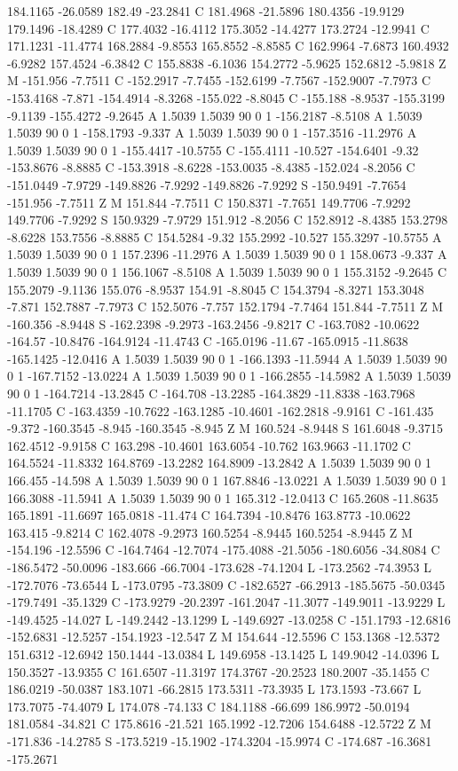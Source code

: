 {{{184.1165 -26.0589 182.49 -23.2841 C 181.4968 -21.5896 180.4356 -19.9129 179.1496 -18.4289 C 177.4032 -16.4112 175.3052 -14.4277 173.2724 -12.9941 C 171.1231 -11.4774 168.2884 -9.8553 165.8552 -8.8585 C 162.9964 -7.6873 160.4932 -6.9282 157.4524 -6.3842 C 155.8838 -6.1036 154.2772 -5.9625 152.6812 -5.9818 Z M -151.956 -7.7511 C -152.2917 -7.7455 -152.6199 -7.7567 -152.9007 -7.7973 C -153.4168 -7.871 -154.4914 -8.3268 -155.022 -8.8045 C -155.188 -8.9537 -155.3199 -9.1139 -155.4272 -9.2645 A 1.5039 1.5039 90 0 1 -156.2187 -8.5108 A 1.5039 1.5039 90 0 1 -158.1793 -9.337 A 1.5039 1.5039 90 0 1 -157.3516 -11.2976 A 1.5039 1.5039 90 0 1 -155.4417 -10.5755 C -155.4111 -10.527 -154.6401 -9.32 -153.8676 -8.8885 C -153.3918 -8.6228 -153.0035 -8.4385 -152.024 -8.2056 C -151.0449 -7.9729 -149.8826 -7.9292 -149.8826 -7.9292 S -150.9491 -7.7654 -151.956 -7.7511 Z M 151.844 -7.7511 C 150.8371 -7.7651 149.7706 -7.9292 149.7706 -7.9292 S 150.9329 -7.9729 151.912 -8.2056 C 152.8912 -8.4385 153.2798 -8.6228 153.7556 -8.8885 C 154.5284 -9.32 155.2992 -10.527 155.3297 -10.5755 A 1.5039 1.5039 90 0 1 157.2396 -11.2976 A 1.5039 1.5039 90 0 1 158.0673 -9.337 A 1.5039 1.5039 90 0 1 156.1067 -8.5108 A 1.5039 1.5039 90 0 1 155.3152 -9.2645 C 155.2079 -9.1136 155.076 -8.9537 154.91 -8.8045 C 154.3794 -8.3271 153.3048 -7.871 152.7887 -7.7973 C 152.5076 -7.757 152.1794 -7.7464 151.844 -7.7511 Z M -160.356 -8.9448 S -162.2398 -9.2973 -163.2456 -9.8217 C -163.7082 -10.0622 -164.57 -10.8476 -164.9124 -11.4743 C -165.0196 -11.67 -165.0915 -11.8638 -165.1425 -12.0416 A 1.5039 1.5039 90 0 1 -166.1393 -11.5944 A 1.5039 1.5039 90 0 1 -167.7152 -13.0224 A 1.5039 1.5039 90 0 1 -166.2855 -14.5982 A 1.5039 1.5039 90 0 1 -164.7214 -13.2845 C -164.708 -13.2285 -164.3829 -11.8338 -163.7968 -11.1705 C -163.4359 -10.7622 -163.1285 -10.4601 -162.2818 -9.9161 C -161.435 -9.372 -160.3545 -8.945 -160.3545 -8.945 Z M 160.524 -8.9448 S 161.6048 -9.3715 162.4512 -9.9158 C 163.298 -10.4601 163.6054 -10.762 163.9663 -11.1702 C 164.5524 -11.8332 164.8769 -13.2282 164.8909 -13.2842 A 1.5039 1.5039 90 0 1 166.455 -14.598 A 1.5039 1.5039 90 0 1 167.8846 -13.0221 A 1.5039 1.5039 90 0 1 166.3088 -11.5941 A 1.5039 1.5039 90 0 1 165.312 -12.0413 C 165.2608 -11.8635 165.1891 -11.6697 165.0818 -11.474 C 164.7394 -10.8476 163.8773 -10.0622 163.415 -9.8214 C 162.4078 -9.2973 160.5254 -8.9445 160.5254 -8.9445 Z M -154.196 -12.5596 C -164.7464 -12.7074 -175.4088 -21.5056 -180.6056 -34.8084 C -186.5472 -50.0096 -183.666 -66.7004 -173.628 -74.1204 L -173.2562 -74.3953 L -172.7076 -73.6544 L -173.0795 -73.3809 C -182.6527 -66.2913 -185.5675 -50.0345 -179.7491 -35.1329 C -173.9279 -20.2397 -161.2047 -11.3077 -149.9011 -13.9229 L -149.4525 -14.027 L -149.2442 -13.1299 L -149.6927 -13.0258 C -151.1793 -12.6816 -152.6831 -12.5257 -154.1923 -12.547 Z M 154.644 -12.5596 C 153.1368 -12.5372 151.6312 -12.6942 150.1444 -13.0384 L 149.6958 -13.1425 L 149.9042 -14.0396 L 150.3527 -13.9355 C 161.6507 -11.3197 174.3767 -20.2523 180.2007 -35.1455 C 186.0219 -50.0387 183.1071 -66.2815 173.5311 -73.3935 L 173.1593 -73.667 L 173.7075 -74.4079 L 174.078 -74.133 C 184.1188 -66.699 186.9972 -50.0194 181.0584 -34.821 C 175.8616 -21.521 165.1992 -12.7206 154.6488 -12.5722 Z M -171.836 -14.2785 S -173.5219 -15.1902 -174.3204 -15.9974 C -174.687 -16.3681 -175.2671 }}}
